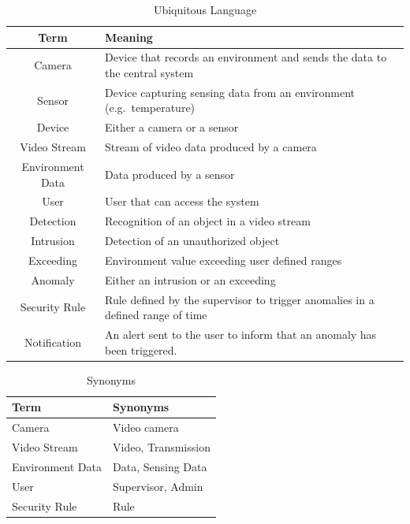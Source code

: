 \documentclass{scrartcl}
\begin{document}
    \renewcommand{\arraystretch}{1.5}
    \begin{table}
        \centering
        \begin{tabularx}{0.7\textwidth}{ | c | >{\centering\arraybackslash}X | }
            \hline
            \textbf{Term} & \textbf{Meaning} \\
            \hline
            Camera & Device that records an environment and sends the data to the central system \\
            \hline
            Sensor & Device capturing sensing data from an environment (e.g.\ temperature) \\
            \hline
            Device & Either a camera or a sensor \\
            \hline
            Video Stream & Stream of video data produced by a camera \\
            \hline
            Environment Data & Data produced by a sensor \\
            \hline
            User & User that can access the system \\
            \hline
            Detection & Recognition of an object in a video stream \\
            \hline
            Intrusion & Detection of an unauthorized object \\
            \hline
            Exceeding & Environment value exceeding user defined ranges \\
            \hline
            Anomaly & Either an intrusion or an exceeding \\
            \hline
            Security Rule & Rule defined by the supervisor to trigger anomalies in a defined range of time \\
            \hline
            Notification & An alert sent to the user to inform that an anomaly has been triggered. \\
            \hline
        \end{tabularx}
        \caption{Ubiquitous Language}
        \label{tab:ubiquitous-language}
    \end{table}

    \renewcommand{\arraystretch}{1.8}
    \begin{table}
        \centering
        \begin{tabularx}{0.6\textwidth}{ | >{\centering\arraybackslash}X | >{\centering\arraybackslash}X | }
            \hline
            \textbf{Term} & \textbf{Synonyms} \\
            \hline
            Camera & Video camera \\
            \hline
            Video Stream & Video, Transmission \\
            \hline
            Environment Data & Data, Sensing Data \\
            \hline
            User & Supervisor, Admin \\
            \hline
            Security Rule & Rule \\
            \hline
        \end{tabularx}
        \caption{Synonyms}
        \label{tab:synonyms}
    \end{table}
\end{document}

